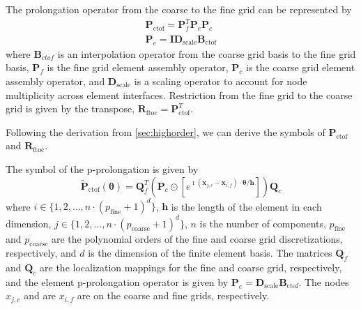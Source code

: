 \documentclass[review]{siamart190516}
\begin{document}
The prolongation operator from the coarse to the fine grid can be represented by
\begin{equation}
\begin{split}
\mathbf{P}_{\text{ctof}} = \mathbf{P}_f^T \mathbf{P}_e \mathbf{P}_c\\
\mathbf{P}_e = \mathbf{I} \mathbf{D}_{\text{scale}} \mathbf{B}_{\text{ctof}}
\end{split}
\end{equation}
where $\mathbf{B}_{ctof}$ is an interpolation operator from the coarse grid basis to the fine grid basis, $\mathbf{P}_f$ is the fine grid element assembly operator, $\mathbf{P}_c$ is the coarse grid element assembly operator, and $\mathbf{D}_{\text{scale}}$ is a scaling operator to account for node multiplicity across element interfaces.
Restriction from the fine grid to the coarse grid is given by the transpose, $\mathbf{R}_{\text{ftoc}} = \mathbf{P}_{\text{ctof}}^T$.

Following the derivation from \cref{sec:highorder}, we can derive the symbols of $\mathbf{P}_{\text{ctof}}$ and $\mathbf{R}_{\text{ftoc}}$.

\begin{definition}
The symbol of the p-prolongation is given by
\begin{equation}
\tilde{\mathbf{P}}_{\text{ctof}} \left( \boldsymbol{\theta} \right) = \mathbf{Q}_f^T \left( \mathbf{P}_e \odot \left[ e^{\imath \left( \mathbf{x}_{j, c} - \mathbf{x}_{i, f} \right) \cdot \boldsymbol{\theta} / \mathbf{h}} \right] \right) \mathbf{Q}_c
\end{equation}
where $i \in \lbrace 1, 2, \dots, n \cdot \left( p_{\text{fine}} + 1 \right)^d \rbrace$, $\mathbf{h}$ is the length of the element in each dimension, $j \in \lbrace 1, 2, \dots, n \cdot \left( p_{\text{coarse}} + 1 \right)^d \rbrace$, $n$ is the number of components, $p_{\text{fine}}$ and $p_{\text{coarse}}$ are the polynomial orders of the fine and coarse grid discretizations, respectively, and $d$ is the dimension of the finite element basis.
The matrices $\mathbf{Q}_f$ and $\mathbf{Q}_c$ are the localization mappings for the fine and coarse grid, respectively, and the element p-prolongation operator is given by $\mathbf{P}_e = \mathbf{D}_{\text{scale}} \mathbf{B}_{\text{ctof}}$.
The nodes $x_{j, c}$ and are $x_{i, f}$ are on the coarse and fine grids, respectively.
\end{definition}\label{def:prolongation_symbol}
\end{document}
